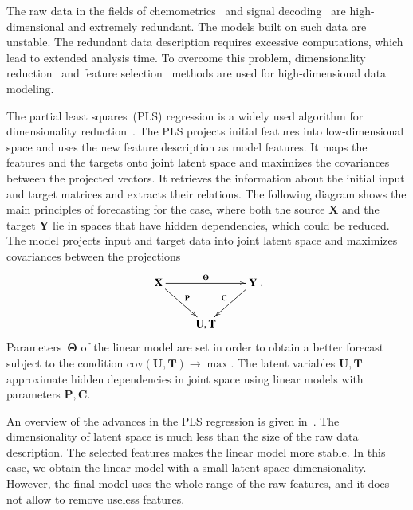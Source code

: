 \documentclass[preprint,authoryear,12pt]{elsarticle}
\theoremstyle{definition}
\begin{document}
The raw data in the fields of chemometrics~\citep{katrutsa2015stress,karimi2014leukemia,lin2016equivalence} and signal decoding~\citep{motrenko2018multi,eliseyev2014stable,eliseyev2012l1} are high-dimensional and extremely redundant.
The models built on such data are unstable. The redundant data description requires excessive computations, which lead to extended analysis time. 
To overcome this problem, dimensionality reduction~\citep{chun2010sparse,mehmood2012review} and feature selection~\citep{katrutsa2015stress,li2017feature} methods are used  for high-dimensional data modeling. 

The partial least squares~(PLS) regression is a widely used algorithm for dimensionality reduction~\citep{lauzon2018sequential,engel2017kernel,biancolillo2017extension,hervas2018sparse}. 
The PLS projects initial features into low-dimensional space and uses the new feature description as model features. 
It maps the features and the targets onto joint latent space and maximizes the covariances between the projected vectors. 
It retrieves the information about the initial input and target matrices and extracts their relations. 
%
The following diagram shows the main principles of forecasting for the case, where both the source $\mathbf{X}$ and the target $\mathbf{Y}$ lie in spaces that have hidden dependencies, which could be reduced. The model projects input and target data into joint latent space and maximizes covariances between the projections
\begin{equation*}
\xymatrix{\mathbf{X}\ar[rr]^{\boldsymbol{\Theta}}\ar[rd]^{\mathbf{P}} & ~  & \mathbf{Y} \ar[ld]_{\mathbf{C}}  \\ 
~ & \mathbf{U},\mathbf{T} & ~ }.
\end{equation*}
Parameters~$\boldsymbol{\Theta}$ of the linear model are set in order to obtain a better forecast subject to the condition $\text{cov}(\mathbf{U},\mathbf{T})\to\max$. The latent variables $\mathbf{U},\mathbf{T}$ approximate hidden dependencies in joint space using linear models with parameters $\mathbf{P},\mathbf{C}$.


An overview of the advances in the PLS regression is given in~\citep{rosipal2006overview,rosipal2011nonlinear}.
The dimensionality of latent space is much less than the size of the raw data description.
The selected features makes the linear model more stable. 
In this case, we obtain the linear model with a small latent space dimensionality.
However, the final model uses the whole range of the raw features, and it does not allow to remove useless features. 
\end{document}
